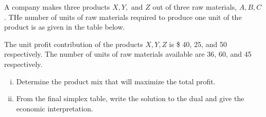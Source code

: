 \begin{frameExample}{}{}
  A company makes three  products $X, Y, \text{ and } Z$ out of three raw materials, $A, B, C$.  THe number of units of raw materials required to produce one unit of the product is as given in the table below.

  {\centering
  \par}
  
  The unit profit contribution of the products $X, Y, Z$ is \$ 40, 25, and 50 respectively. The number of units of raw materials available are 36, 60, and 45 respectively.
  
  \begin{enumerate}[i)] \justifying \parskip3mm
  \item Determine the product mix that will maximize the total profit.
  \item From the final simplex table, write the solution to the dual and give the economic interpretation. 
  \end{enumerate}
\end{frameExample}

